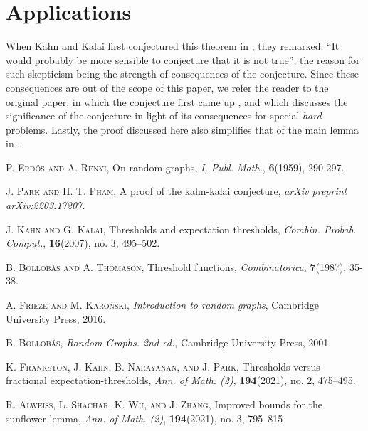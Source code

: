 \documentclass[12pt,oneside,reqno]{amsart}
\theoremstyle{definition}
\numberwithin{equation}{theorem}
\begin{document}
\section{Applications}

When Kahn and Kalai first conjectured this theorem in \cite{okkc}, they remarked: “It would probably be more sensible to conjecture
that it is not true”; the reason for such skepticism being the strength of consequences of the conjecture. Since these consequences are out of the scope of this paper, we refer the reader to the original paper, in which the conjecture first came up \cite{okkc}, and \cite{ffkkc} which discusses the significance of the conjecture in light of its consequences for special \emph{hard} problems. Lastly, the proof discussed here also simplifies that of the main lemma in \cite{ffkkc}.

\pagebreak

\begin{thebibliography}{99}

 \textsc{P. Erd\H{o}s and A. R\`{e}nyi}, On random graphs, \textit{I, Publ. Math.}, \textbf{6}(1959), 290-297.

 \textsc{J. Park and H. T. Pham}, A proof of the kahn-kalai conjecture, \textit{arXiv preprint arXiv:2203.17207.}

 \textsc{J. Kahn and G. Kalai}, Thresholds and expectation thresholds, \textit{Combin. Probab. Comput.}, \textbf{16}(2007), no. 3, 495–502.

 \textsc{B. Bollob\'as and A. Thomason}, Threshold functions, \textit{Combinatorica}, \textbf{7}(1987), 35-38.

 \textsc{A. Frieze and M. Karo\'{n}ski}, \textit{Introduction to random graphs}, Cambridge University Press, 2016.

 \textsc{B. Bollob\'as}, \textit{Random Graphs. 2nd ed.}, Cambridge University Press, 2001.

 \textsc{K. Frankston, J. Kahn, B. Narayanan, and J. Park}, Thresholds versus fractional expectation-thresholds, \textit{Ann. of Math. (2)}, \textbf{194}(2021), no. 2, 475–495.

 \textsc{R. Alweiss, L. Shachar, K. Wu, and J. Zhang}, Improved bounds for the sunflower lemma, \textit{Ann. of Math. (2)}, \textbf{194}(2021), no. 3, 795–815

\end{thebibliography}
\end{document}
